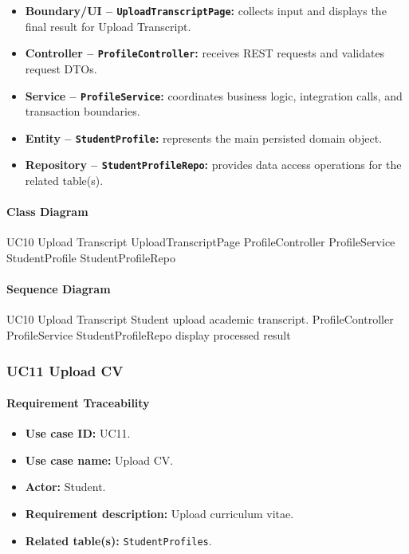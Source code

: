 \begin{itemize}
    \item \textbf{Boundary/UI -- \texttt{UploadTranscriptPage}:} collects input and displays the final result for Upload Transcript.
    \item \textbf{Controller -- \texttt{ProfileController}:} receives REST requests and validates request DTOs.
    \item \textbf{Service -- \texttt{ProfileService}:} coordinates business logic, integration calls, and transaction boundaries.
    \item \textbf{Entity -- \texttt{StudentProfile}:} represents the main persisted domain object.
    \item \textbf{Repository -- \texttt{StudentProfileRepo}:} provides data access operations for the related table(s).
\end{itemize}

\paragraph{Class Diagram}

\ClassDiagram
{UC10 Upload Transcript}
{UploadTranscriptPage}
{ProfileController}
{ProfileService}
{StudentProfile}
{StudentProfileRepo}

\paragraph{Sequence Diagram}

\SequenceDiagram
{UC10 Upload Transcript}
{Student}
{upload academic transcript.}
{ProfileController}
{ProfileService}
{StudentProfileRepo}
{display processed result}

\subsubsection{UC11 Upload CV}

\paragraph{Requirement Traceability}

\begin{itemize}
    \item \textbf{Use case ID:} UC11.
    \item \textbf{Use case name:} Upload CV.
    \item \textbf{Actor:} Student.
    \item \textbf{Requirement description:} Upload curriculum vitae.
    \item \textbf{Related table(s):} \texttt{StudentProfiles}.
\end{itemize}

